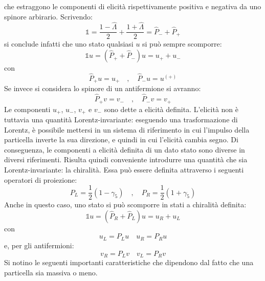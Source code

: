 \documentclass{subnucbo}
\begin{document}
che estraggono le componenti di elicità rispettivamente positiva e negativa da uno spinore arbirario. Scrivendo:
\begin{equation}
        \mathbb{1} = \frac { 1 - \hat{\Lambda } } { 2 } + \frac { 1 + \hat{\Lambda } } { 2 } = \hat{P}_{-} + \hat{P} _ { + }
\end{equation}
si conclude infatti che uno stato qualsiasi $u$ si può sempre scomporre:
\begin{equation}
        \mathbb { 1 } u = \left( \hat{P} _ { + } + \hat{P} _ { - } \right) u = u _ { + } + u _ { - }
\end{equation}
con
\begin{equation}
        \hat { P } _ { + } u = u_{+}\quad ,\quad \hat { P } _ { - } u = u ^ { ( + ) }
\end{equation}
Se invece si considera lo spinore di un antifermione si avranno:
\begin{equation}
        \hat { P } _ { + } v = v_{-} \quad ,\quad \hat { P } _ { - } v = v _ { + }
\end{equation}
Le componenti $u_{+}$, $u_{-}$, $v_{+}$ e $v_{-}$ sono dette a elicità definita.
L'elicità non è tuttavia una quantità Lorentz-invariante: eseguendo una trasformazione di Lorentz, è possibile mettersi in un sistema di riferimento in cui l'impulso della particella inverte la sua direzione, e quindi in cui l'elicità cambia segno. Di conseguenza, le componenti a elicità definita di un dato stato sono diverse in diversi riferimenti.
Risulta quindi conveniente introdurre una quantità che sia Lorentz-invariante: la chiralità. Essa può essere definita attraverso i seguenti operatori di proiezione:
\begin{equation}
        P _ { L } = \frac { 1 } { 2 } \left( 1 - \gamma _ { 5 } \right) \quad , \quad P _ { R } = \frac { 1 } { 2 } \left( 1 + \gamma _ { 5 } \right)
        \label{eq:plpr}
\end{equation}
Anche in questo caso, uno stato si può scomporre in stati a chiralità definita:
\begin{equation}
        \mathbb { 1 } u = \left( \hat{P} _ { R } + \hat{P} _ { L } \right) u = u _ { R } + u _ { L }
\end{equation}
con
\begin{equation}
        u _ { L } = P _ { L } u \quad u _ { R } = P _ { R } u
\end{equation}
e, per gli antifermioni:
\begin{equation}
        v _ { R } = P _ { L } v \quad v _ { L } = P _ { R } v
\end{equation}
Si notino le seguenti importanti caratteristiche che dipendono dal fatto che una particella sia massiva o meno.
\end{document}

